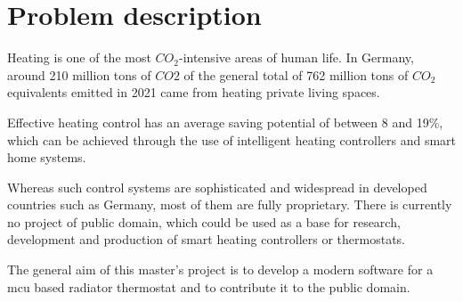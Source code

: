 %
%

\chapter{Problem description}
\label{chap:Introduction}
%
Heating is one of the most $CO_2$-intensive areas of human life. In Germany, around 210 million tons of $CO2$ of the general total of 762 million tons of $CO_2$ equivalents emitted in 2021 came from heating private living spaces. \cite{StatistischesBundesamt.16.07.2025} \cite{Umweltbundesamt.15.03.2022}

Effective heating control has an average saving potential of between 8 and 19\%, which can be achieved through the use of intelligent heating controllers and smart home systems. \cite{Kersken.2018} 

Whereas such control systems are sophisticated and widespread in developed countries such as Germany, most of them are fully proprietary. There is currently no project of public domain, which could be used as a base for research, development and production of smart heating controllers or thermostats.

The general aim of this master's project is to develop a modern software for a \ac{mcu} based radiator thermostat and to contribute it to the public domain.